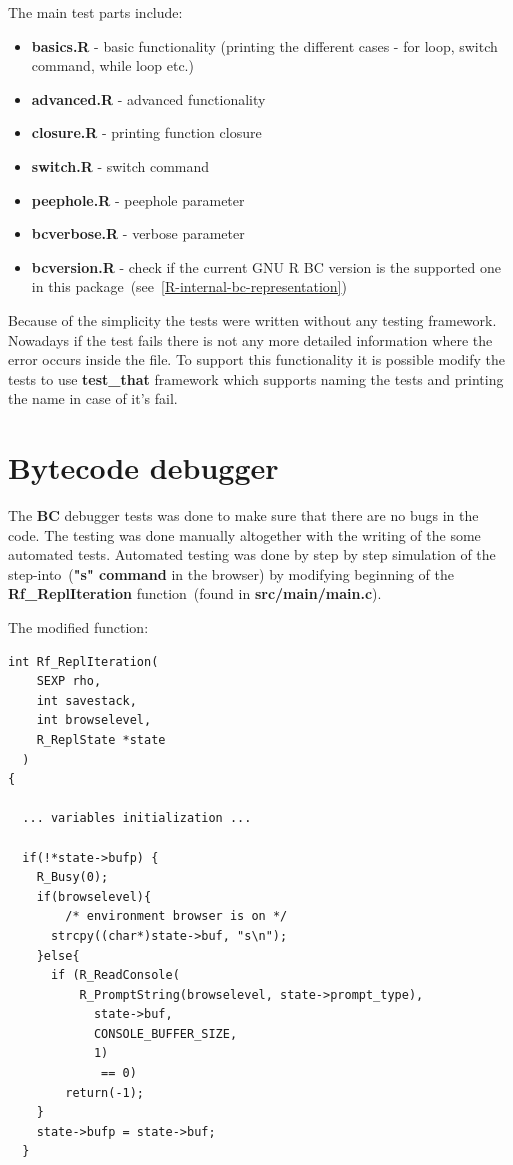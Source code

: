 \documentclass[thesis=M,english]{FITthesis}[2018/10/20]
\begin{document}
{The main test parts include:
\begin{itemize}
	\item \textbf{basics.R} - basic functionality (printing the different cases - for loop, switch command, while loop etc.)
	\item \textbf{advanced.R} - advanced functionality
	\item \textbf{closure.R} - printing function closure
	\item \textbf{switch.R} - switch command
	\item \textbf{peephole.R} - peephole parameter
	\item \textbf{bcverbose.R} - verbose parameter
	\item \textbf{bcversion.R} - check if the current GNU R BC version is the supported one in this package~(see~\ref{R-internal-bc-representation})
\end{itemize}

Because of the simplicity the tests were written without any testing framework. Nowadays if the test fails there is not any more detailed information where the error occurs inside the file. To support this functionality it is possible modify the tests to use \textbf{test{\_}that} framework which supports naming the tests and printing the name in case of it's fail. 

\section{Bytecode debugger}

The \textbf{BC} debugger tests was done to make sure that there are no bugs in the code. The testing was done manually altogether with the writing of the some automated tests. Automated testing was done by step by step simulation of the step-into~(\textbf{"s" command} in the browser) by modifying beginning of the \textbf{Rf{\_}ReplIteration} function~(found in \textbf{src/main/main.c}). 

The modified function:
\begin{lstlisting}
int Rf_ReplIteration(
	SEXP rho, 
	int savestack, 
	int browselevel, 
	R_ReplState *state
  )
{

  ... variables initialization ...

  if(!*state->bufp) {
    R_Busy(0);
    if(browselevel){	
    	/* environment browser is on */
      strcpy((char*)state->buf, "s\n");
    }else{
      if (R_ReadConsole(
      	  R_PromptString(browselevel, state->prompt_type),
            state->buf, 
            CONSOLE_BUFFER_SIZE, 
            1)
             == 0)
        return(-1);
    }
    state->bufp = state->buf;
  }


\end{lstlisting}}
\end{document}
